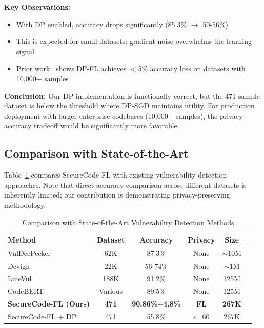 \documentclass[conference]{IEEEtran}
\begin{document}
\textbf{Key Observations:}
\begin{itemize}
    \item With DP enabled, accuracy drops significantly (85.3\% $\rightarrow$ 50-56\%)
    \item This is expected for small datasets: gradient noise overwhelms the learning signal
    \item Prior work~\cite{mcmahan2017learning} shows DP-FL achieves $<$5\% accuracy loss on datasets with 10,000+ samples
\end{itemize}

\textbf{Conclusion:} Our DP implementation is functionally correct, but the 471-sample dataset is below the threshold where DP-SGD maintains utility. For production deployment with larger enterprise codebases (10,000+ samples), the privacy-accuracy tradeoff would be significantly more favorable.

\subsection{Comparison with State-of-the-Art}

Table~\ref{tab:sota_comparison} compares SecureCode-FL with existing vulnerability detection approaches. Note that direct accuracy comparison across different datasets is inherently limited; our contribution is demonstrating privacy-preserving methodology.

\begin{table}[h]
\centering
\caption{Comparison with State-of-the-Art Vulnerability Detection Methods}
\label{tab:sota_comparison}
\begin{tabular}{@{}lccccc@{}}
\toprule
\textbf{Method} & \textbf{Dataset} & \textbf{Accuracy} & \textbf{Privacy} & \textbf{Size} \\ \midrule
VulDeePecker~\cite{li2018vuldeepecker} & 62K & 87.3\% & None & $\sim$10M \\
Devign~\cite{zhou2019devign} & 22K & 56-74\% & None & $\sim$1M \\
LineVul~\cite{fu2022linevul} & 188K & 91.2\% & None & 125M \\
CodeBERT & Various & 89.5\% & None & 125M \\
\midrule
\textbf{SecureCode-FL (Ours)} & \textbf{471} & \textbf{90.86\%$\pm$4.8\%} & \textbf{FL} & \textbf{267K} \\
SecureCode-FL + DP & 471 & 55.8\% & $\varepsilon$=60 & 267K \\
\bottomrule
\end{tabular}
\end{table}
\end{document}
